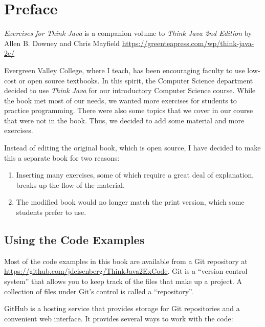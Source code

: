 \chapter*{Preface}


{\it Exercises for Think Java} is a companion volume to {\it Think Java 2nd Edition} by Allen B. Downey and Chris Mayfield 
\url{https://greenteapress.com/wp/think-java-2e/}

Evergreen Valley College, where I teach, has been encouraging faculty to use low-cost or open source textbooks. In this spirit, the Computer Science department decided to use {\it Think Java} for our introductory Computer Science course. While the book met most of our needs, we wanted more exercises for students to practice programming. There were also some topics that we cover in our course that were not in the book. Thus, we decided to add some material and more exercises.

Instead of editing the original book, which is open source, I have decided to make this a separate book for two reasons:

\begin{enumerate}
\item Inserting many exercises, some of which require a great deal of explanation, breaks up the flow of the material. 
\item The modified book would no longer match the print version, which some students prefer to use.
\end{enumerate}

\section*{Using the Code Examples}
\label{code}

Most of the code examples in this book are available from a Git repository at \url{https://github.com/jdeisenberg/ThinkJava2ExCode}.
Git is a ``version control system'' that allows you to keep track of the files that make up a project.
A collection of files under Git's control is called a ``repository''.


GitHub is a hosting service that provides storage for Git repositories and a convenient web interface.
It provides several ways to work with the code:

